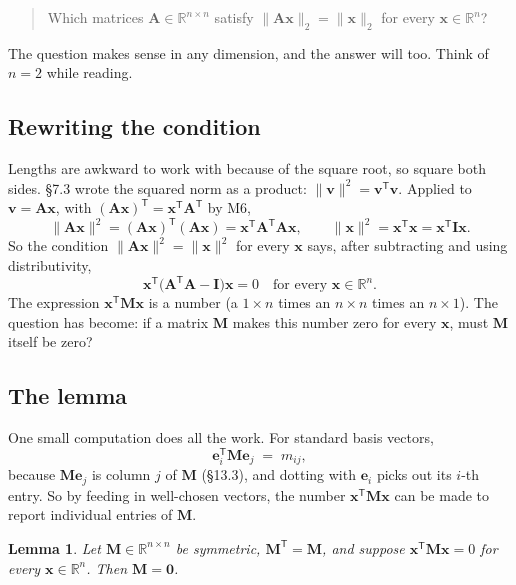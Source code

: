 \documentclass[11pt]{article}
\theoremstyle{plain}
\newtheorem{lem}[thm]{Lemma}
\theoremstyle{definition}
\theoremstyle{remark}
\newcommand{\R}{\mathbb{R}}
\newcommand{\vc}[1]{\mathbf{#1}}
\newcommand{\mt}[1]{\mathbf{#1}}
\newcommand{\norm}[1]{\lVert #1\rVert}
\newcommand{\T}{^{\mathsf{T}}}
\begin{document}
\begin{quote}
Which matrices $\mt{A}\in\R^{n\times n}$ satisfy
$\norm{\mt{A}\vc{x}}_2=\norm{\vc{x}}_2$ for every $\vc{x}\in\R^{n}$?
\end{quote}

\noindent The question makes sense in any dimension, and the answer will too.
Think of $n=2$ while reading.

\subsection{Rewriting the condition}
Lengths are awkward to work with because of the square root, so square both
sides. \S7.3 wrote the squared norm as a product: $\norm{\vc{v}}^{2}=\vc{v}\T\vc{v}$.
Applied to $\vc{v}=\mt{A}\vc{x}$, with $(\mt{A}\vc{x})\T=\vc{x}\T\mt{A}\T$ by
M6,
\[
  \norm{\mt{A}\vc{x}}^{2}=(\mt{A}\vc{x})\T(\mt{A}\vc{x})
  =\vc{x}\T\mt{A}\T\mt{A}\vc{x},
  \qquad
  \norm{\vc{x}}^{2}=\vc{x}\T\vc{x}=\vc{x}\T\mt{I}\vc{x}.
\]
So the condition $\norm{\mt{A}\vc{x}}^{2}=\norm{\vc{x}}^{2}$ for every $\vc{x}$
says, after subtracting and using distributivity,
\[
  \boxed{\;\vc{x}\T\bigl(\mt{A}\T\mt{A}-\mt{I}\bigr)\vc{x}=0
  \quad\text{for every }\vc{x}\in\R^{n}.\;}
\]
The expression $\vc{x}\T\mt{M}\vc{x}$ is a number (a $1\times n$ times an
$n\times n$ times an $n\times1$). The question has become: if a matrix
$\mt{M}$ makes this number zero for every $\vc{x}$, must $\mt{M}$ itself be
zero?

\subsection{The lemma}
One small computation does all the work. For standard basis vectors,
\[
  \vc{e}_i\T\mt{M}\vc{e}_j \;=\; m_{ij},
\]
because $\mt{M}\vc{e}_j$ is column $j$ of $\mt{M}$ (\S13.3), and dotting with
$\vc{e}_i$ picks out its $i$-th entry. So by feeding in well-chosen
vectors, the number $\vc{x}\T\mt{M}\vc{x}$ can be made to report individual
entries of $\mt{M}$.

\begin{lem}
\label{lem:quadzero}
Let $\mt{M}\in\R^{n\times n}$ be symmetric, $\mt{M}\T=\mt{M}$, and suppose
$\vc{x}\T\mt{M}\vc{x}=0$ for every $\vc{x}\in\R^{n}$. Then $\mt{M}=\mt{0}$.
\end{lem}
\end{document}
